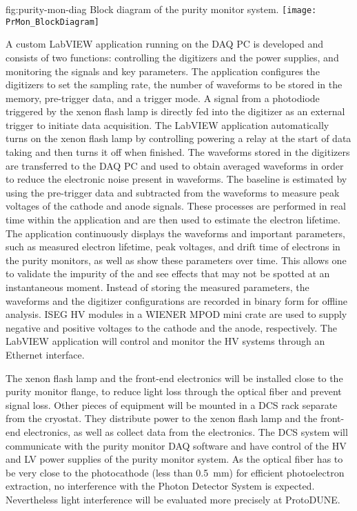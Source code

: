 \begin{dunefigure}{fig:purity-mon-diag}
  {Block diagram of the purity monitor system.}
  \texttt{[image: PrMon\_BlockDiagram]}%
\end{dunefigure}

A custom LabVIEW application running on the DAQ PC is developed and consists of two functions: controlling the digitizers and the power supplies, and monitoring the signals and key parameters. The application configures the digitizers to set the sampling rate, the number of waveforms to be stored in the memory, pre-trigger data, and a trigger mode. A signal from a photodiode triggered by the xenon flash lamp is directly fed into the digitizer as an external trigger to initiate data acquisition. The LabVIEW application automatically turns on the xenon flash lamp by controlling powering a relay at the start of data taking and then turns it off when finished. The waveforms stored in the digitizers are transferred to the DAQ PC and used to obtain averaged waveforms in order to reduce the electronic noise present in waveforms. The baseline is estimated by using the pre-trigger data and subtracted from the waveforms to measure peak voltages of the cathode and anode signals. These processes are performed in real time within the application and are then used to estimate the electron lifetime. The application continuously displays the waveforms and important parameters, such as measured electron lifetime, peak voltages, and drift time of electrons in the purity monitors, as well as show these parameters over time. This allows one to validate the impurity of the  and see effects that may not be spotted at an instantaneous moment. Instead of storing the measured parameters, the waveforms and the digitizer configurations are recorded in binary form for offline analysis. ISEG HV modules in a WIENER MPOD mini crate are used to supply negative and positive voltages to the cathode and the anode, respectively. The LabVIEW application will control and monitor the HV systems through an Ethernet interface.  

The xenon flash lamp and the front-end electronics will be installed close to the purity monitor flange, to reduce light loss through the optical fiber and prevent signal loss. Other pieces of equipment will be mounted in a DCS rack separate from the cryostat. They distribute power to the xenon flash lamp and the front-end electronics, as well as collect data from the electronics. The DCS system will communicate with the purity monitor DAQ software and have control of the HV and LV power supplies of the purity monitor system. 
As the optical fiber has to be very close to the photocathode (less than \SI{0.5}{\milli\meter}) for efficient photoelectron extraction, no interference with the Photon Detector System is expected. Nevertheless light interference will be evaluated more precisely at ProtoDUNE. 

